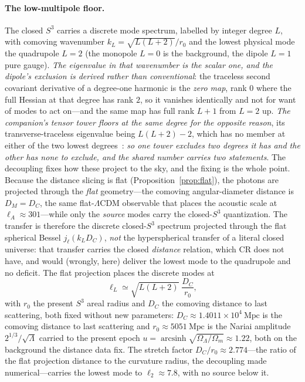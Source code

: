\documentclass[11pt,a4paper]{article}
\theoremstyle{plain}
\theoremstyle{definition}
\theoremstyle{remark}
\begin{document}
\paragraph{The low-multipole floor.}
The closed $S^3$ carries a discrete mode spectrum, labelled by integer degree $L$, with comoving wavenumber $k_L=\sqrt{L(L+2)}/r_0$ and the lowest physical mode the quadrupole $L=2$ (the monopole $L=0$ is the background, the dipole $L=1$ pure gauge). \emph{The eigenvalue in that wavenumber is the scalar one, and the dipole's exclusion is derived rather than conventional}: the traceless second covariant derivative of a degree-one harmonic is the \emph{zero map}, rank $0$ where the full Hessian at that degree has rank $2$, so it vanishes identically and not for want of modes to act on---and the same map has full rank $L+1$ from $L=2$ up. \emph{The companion's tensor tower floors at the same degree for the opposite reason}, its transverse-traceless eigenvalue being $L(L+2)-2$, which has no member at either of the two lowest degrees~\cite{JanzenCosmogenesis}: \emph{so one tower excludes two degrees it has and the other has none to exclude, and the shared number carries two statements}. The decoupling fixes how these project to the sky, and the fixing is the whole point. Because the distance slicing is flat (Proposition~\ref{prop:flat}), the photons are projected through the \emph{flat} geometry---the comoving angular-diameter distance is $D_M=D_C$, the same flat-$\Lambda$CDM observable that places the acoustic scale at $\ell_A\approx301$---while only the \emph{source} modes carry the closed-$S^3$ quantization. The transfer is therefore the discrete closed-$S^3$ spectrum projected through the flat spherical Bessel $j_\ell(k_L D_C)$, \emph{not} the hyperspherical transfer of a literal closed universe: that transfer carries the closed \emph{distance} relation, which CR does not have, and would (wrongly, here) deliver the lowest mode to the quadrupole and no deficit. The flat projection places the discrete modes at
\begin{equation}
\ell_L\simeq\sqrt{L(L+2)}\;\frac{D_C}{r_0},
\label{eq:lowell}
\end{equation}
with $r_0$ the present $S^3$ areal radius and $D_C$ the comoving distance to last scattering, both fixed without new parameters: $D_C\approx1.4011\times10^{4}\ \mathrm{Mpc}$ is the comoving distance to last scattering and $r_0\approx5051\ \mathrm{Mpc}$ is the Nariai amplitude $2^{1/3}/\sqrt\Lambda$ carried to the present epoch $u=\operatorname{arcsinh}\sqrt{\Omega_\Lambda/\Omega_m}\approx1.22$, both on the background the distance data fix. The stretch factor $D_C/r_0\approx2.774$---the ratio of the flat projection distance to the curvature radius, the decoupling made numerical---carries the lowest mode to $\ell_2\approx7.8$, with no source below it.
\end{document}
